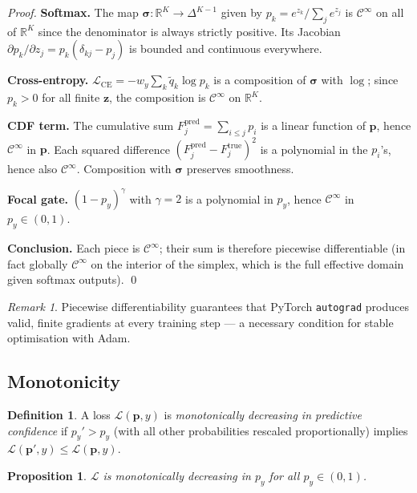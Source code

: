 \documentclass[12pt, a4paper]{article}
\newtheorem{proposition}{Proposition}
\theoremstyle{definition}
\newtheorem{definition}{Definition}
\theoremstyle{remark}
\newtheorem{remark}{Remark}
\begin{document}
\begin{proof}
\textbf{Softmax.}
The map $\boldsymbol{\sigma}: \mathbb{R}^K \to \Delta^{K-1}$ given by
$p_k = e^{z_k}/\sum_j e^{z_j}$ is $\mathcal{C}^\infty$ on all of
$\mathbb{R}^K$ since the denominator is always strictly positive. Its
Jacobian $\partial p_k/\partial z_j = p_k(\delta_{kj}-p_j)$ is bounded
and continuous everywhere.

\textbf{Cross-entropy.}
$\mathcal{L}_{\mathrm{CE}} = -w_y\sum_{k}\tilde{q}_k\log p_k$
is a composition of $\boldsymbol{\sigma}$ with $\log$; since $p_k > 0$
for all finite $\mathbf{z}$, the composition is $\mathcal{C}^\infty$ on $\mathbb{R}^K$.

\textbf{CDF term.}
The cumulative sum $F_j^{\mathrm{pred}} = \sum_{i \leq j} p_i$ is a linear
function of $\mathbf{p}$, hence $\mathcal{C}^\infty$ in $\mathbf{p}$.
Each squared difference $(F_j^{\mathrm{pred}} - F_j^{\mathrm{true}})^2$
is a polynomial in the $p_i$'s, hence also $\mathcal{C}^\infty$.
Composition with $\boldsymbol{\sigma}$ preserves smoothness.

\textbf{Focal gate.}
$(1-p_y)^{\gamma}$ with $\gamma=2$ is a polynomial in $p_y$, hence
$\mathcal{C}^\infty$ in $p_y \in (0,1)$.

\textbf{Conclusion.}
Each piece is $\mathcal{C}^\infty$; their sum is therefore
piecewise differentiable (in fact globally $\mathcal{C}^\infty$ on the
interior of the simplex, which is the full effective domain given softmax
outputs). \qed
\end{proof}

\begin{remark}
Piecewise differentiability guarantees that PyTorch \texttt{autograd}
produces valid, finite gradients at every training step — a necessary
condition for stable optimisation with Adam.
\end{remark}

\subsection{Monotonicity}

\begin{definition}
A loss $\mathcal{L}(\mathbf{p}, y)$ is \emph{monotonically decreasing in
predictive confidence} if $p_y' > p_y$ (with all other probabilities
rescaled proportionally) implies $\mathcal{L}(\mathbf{p}', y) \leq
\mathcal{L}(\mathbf{p}, y)$.
\end{definition}

\begin{proposition}
$\mathcal{L}$ is monotonically decreasing in $p_y$ for all
$p_y \in (0,1)$.
\end{proposition}
\end{document}
